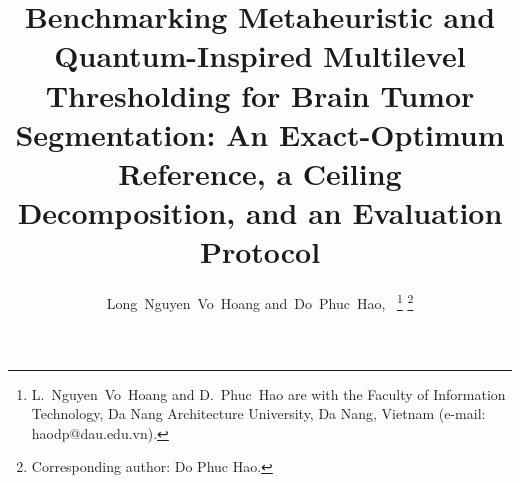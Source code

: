 \documentclass[journal]{IEEEtran}
\theoremstyle{plain}
\theoremstyle{definition}
\begin{document}
\title{Benchmarking Metaheuristic and Quantum-Inspired Multilevel Thresholding
for Brain Tumor Segmentation: An Exact-Optimum Reference, a Ceiling
Decomposition, and an Evaluation Protocol}

\author{Long~Nguyen~Vo~Hoang
        and~Do~Phuc~Hao,~%
\thanks{L.~Nguyen~Vo~Hoang and D.~Phuc~Hao are with the Faculty of Information
Technology, Da Nang Architecture University, Da Nang, Vietnam
(e-mail: haodp@dau.edu.vn).}%
\thanks{Corresponding author: Do Phuc Hao.}}

\maketitle
\end{document}
